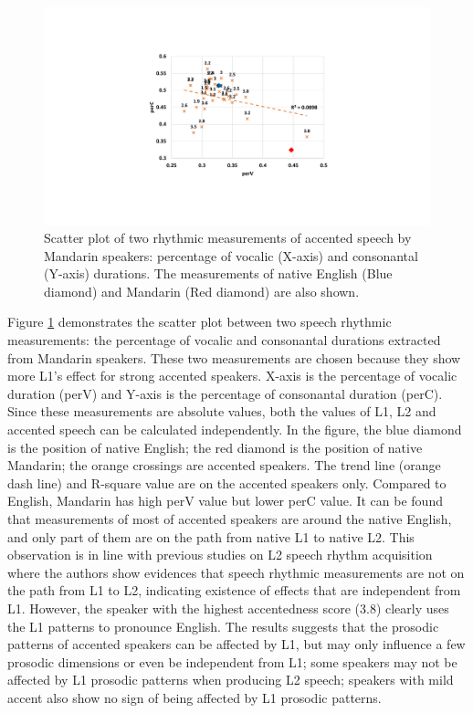 \begin{figure}[t]
        \begin{minipage}[t]{1.0\linewidth}
        \centering
            \includegraphics[width=5.0in]{figures/ch7_supraseg.pdf}
        \end{minipage}%
        \caption{Scatter plot of two rhythmic measurements of accented speech by Mandarin speakers: percentage of vocalic (X-axis) and consonantal (Y-axis) durations. The measurements of native English (Blue diamond) and Mandarin (Red diamond) are also shown.}
        \centering
        \label{fig:ch7_supraseg}
     \end{figure}

Figure \ref{fig:ch7_supraseg} demonstrates the scatter plot between two speech rhythmic measurements: the percentage of vocalic and consonantal durations extracted from Mandarin speakers. These two measurements are chosen because they show more L1's effect for strong accented speakers. X-axis is the percentage of vocalic duration (perV) and Y-axis is the percentage of consonantal duration (perC). Since these measurements are absolute values, both the values of L1, L2 and accented speech can be calculated independently. In the figure, the blue diamond is the position of native English; the red diamond is the position of native Mandarin; the orange crossings are accented speakers. The trend line (orange dash line) and R-square value are on the accented speakers only. Compared to English, Mandarin has high perV value but lower perC value. It can be found that measurements of most of accented speakers are around the native English, and only part of them are on the path from native L1 to native L2. This observation is in line with previous studies on L2 speech rhythm acquisition \citep{stockmal2005measures,lin2008interlanguage,li2014l2} where the authors show evidences that speech rhythmic measurements are not on the path from L1 to L2, indicating existence of effects that are independent from L1. However, the speaker with the highest accentedness score (3.8) clearly uses the L1 patterns to pronounce English. The results suggests that the prosodic patterns of accented speakers can be affected by L1, but may only influence a few prosodic dimensions or even be independent from L1; some speakers may not be affected by L1 prosodic patterns when producing L2 speech; speakers with mild accent also show no sign of being affected by L1 prosodic patterns.

